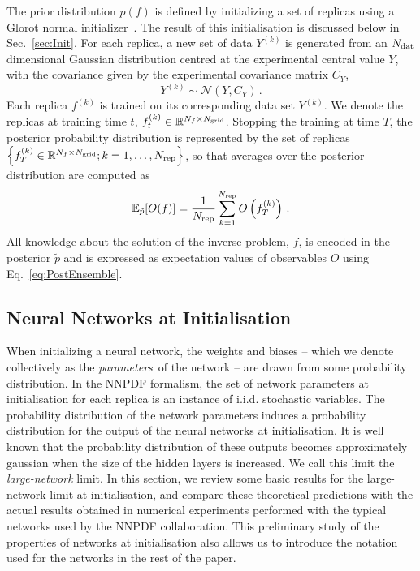 The prior distribution $p(f)$ is defined by initializing a set of replicas using
a Glorot normal initializer~\cite{glorot2010understanding}. The result of this
initialisation is discussed below in Sec.~\ref{sec:Init}. For each replica, a
new set of data $Y^{(k)}$ is generated from an $N_{\mathrm{dat}}$ dimensional Gaussian
distribution centred at the experimental central value $Y$, with the covariance
given by the experimental covariance matrix $C_Y$,
\begin{equation}
    \label{eq:ExpReplicaDistr}
    Y^{(k)} \sim \mathcal{N}\left(Y, C_Y\right)\, .
\end{equation}
Each replica $f^{(k)}$ is trained on its corresponding data set $Y^{(k)}$. We
denote the replicas at training time $t$, $f^{(k)}_{t} \in
\mathbb{R}^{N_{f}\times N_{\mathrm{grid}}}$. Stopping the training at time $T$, the
posterior probability distribution is represented by the set of replicas
$\left\{f^{(k)}_{T}\in \mathbb{R}^{N_{f}\times N_{\mathrm{grid}}}; k=1, \ldots,
N_{\rm rep}\right\}$, so that averages over the posterior distribution are computed
as
\begin{equation}
    \label{eq:PostEnsemble}
    \mathbb{E}_{\tilde{p}}[O(f)] = \frac{1}{N_{\rm rep}} \sum_{k=1}^{N_{\rm rep}}
        O\left(f^{(k)}_{T}\right)\, .
\end{equation}
All knowledge about the solution of the inverse problem, $f$, is encoded in the
posterior $\tilde{p}$ and is expressed as expectation values of observables $O$
using Eq.~\eqref{eq:PostEnsemble}.

\subsection{Neural Networks at Initialisation}

When initializing a neural network, the weights and biases -- which we denote collectively as the {\em parameters}\ 
of the network -- are drawn from some probability distribution. In 
the NNPDF formalism, the set of network parameters at initialisation for each replica is an instance 
of i.i.d. stochastic variables. The probability distribution
of the network parameters induces a probability distribution for the output of the neural networks at initialisation. 
It is well known that the probability distribution of these outputs becomes approximately gaussian when the size of
the hidden layers is increased. We call this limit the {\em large-network} limit. 
In this section, we review some basic results for the large-network limit at initialisation, and 
compare these theoretical 
predictions with the actual results obtained in numerical experiments performed with the typical networks 
used by the NNPDF collaboration. 
This preliminary study of the properties of networks at initialisation also allows us to introduce the 
notation used for the networks in the rest of the paper. 

